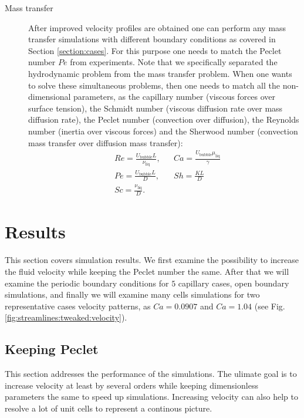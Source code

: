 \documentclass{article}
\newcommand{\ububble}{U_{\mathrm{bubble}}}
\begin{document}
\begin{description}
\item[Mass transfer] After improved velocity profiles are obtained one can perform any mass
transfer simulations with different boundary conditions as covered in Section \ref{section:cases}.
For this purpose one needs to match the Peclet number $Pe$ from experiments. Note that we
specifically separated the hydrodynamic problem from the mass transfer problem. When one wants to
solve these simultaneous problems, then one needs to match all the non-dimensional parameters, as
the capillary number (viscous forces over surface tension), the Schmidt number (viscous diffusion
rate over mass diffusion rate), the Peclet number (convection over diffusion), the Reynolds number
(inertia over viscous forces) and the Sherwood
number (convection mass transfer over diffusion mass transfer):
\begin{equation}
\begin{aligned}
&Re=\frac{\ububble L}{\nu_{\mathrm{liq}}},&&Ca=\frac{\ububble \mu_{\mathrm{liq}}}{\gamma}\\
&Pe=\frac{\ububble L}{D},&&Sh=\frac{K L}{D}\\
&Sc=\frac{\nu_{\mathrm{liq}}}{D}.&&
\end{aligned}
\end{equation}
\end{description}

\section{Results}
This section covers simulation results. We first examine the possibility to increase the fluid
velocity while keeping the Peclet number the same. After that we will examine the periodic boundary
conditions for $5$ capillary cases, open boundary simulations, and finally we will examine many
cells simulations for two representative cases velocity patterns, as $Ca=0.0907$ and $Ca=1.04$
(see Fig. \ref{fig:streamlines:tweaked:velocity}). 

\subsection{Keeping Peclet}
\label{section:keeping:peclet}
This section addresses the performance of the simulations. The ulimate goal is to increase
velocity at least by several orders while keeping dimensionless parameters the same to speed up
simulations. Increasing velocity can also help to resolve a lot of unit cells to represent a
continous picture.
\end{document}
